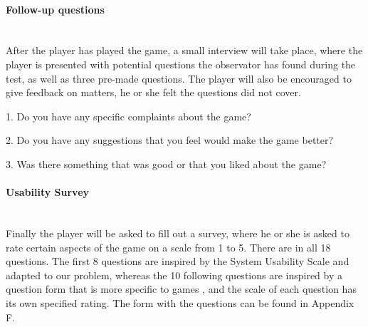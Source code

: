 	\paragraph{Follow-up questions}\mbox{}\\

		After the player has played the game, a small interview will take place, where the player is presented with potential questions the observator has found during the test, as well as three pre-made questions. The player will also be encouraged to give feedback on matters, he or she felt the questions did not cover.

		1. Do you have any specific complaints about the game?

		2. Do you have any suggestions that you feel would make the game better?

		3. Was there something that was good or that you liked about the game?

	\paragraph{Usability Survey}\mbox{}\\

		Finally the player will be asked to fill out a survey, where he or she is asked to rate certain aspects of the game on a scale from 1 to 5. There are in all 18 questions. The first 8 questions are inspired by the System Usability Scale \cite{sus} and adapted to our problem, whereas the 10 following questions are inspired by a question form that is more specific to games \cite{evaluationSheet}, and the scale of each question has its own specified rating. The form with the questions can be found in Appendix F.

